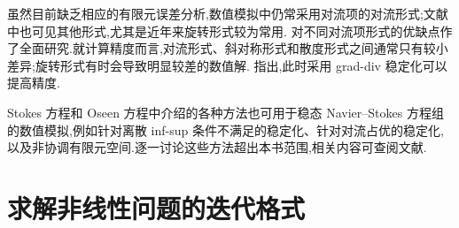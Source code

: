 \begin{note}[数值模拟中的对流项形式]\label{note:steady-ns-convection-forms-simulations}
虽然目前缺乏相应的有限元误差分析,数值模拟中仍常采用对流项的对流形式;文献中也可见其他形式,尤其是近年来旋转形式较为常用.\textcite{Rockel2013} 对不同对流项形式的优缺点作了全面研究.就计算精度而言,对流形式、斜对称形式和散度形式之间通常只有较小差异;旋转形式有时会导致明显较差的数值解.\textcite{Olshanskii2002} 指出,此时采用 grad-div 稳定化可以提高精度.
\end{note}

\begin{note}[其他离散方法]\label{note:steady-ns-other-discretizations}
Stokes 方程和 Oseen 方程中介绍的各种方法也可用于稳态 Navier--Stokes 方程组的数值模拟,例如针对离散 inf-sup 条件不满足的稳定化、针对对流占优的稳定化,以及非协调有限元空间.逐一讨论这些方法超出本书范围,相关内容可查阅文献.
\end{note}

\section{求解非线性问题的迭代格式}\label{sec:steady-ns-iterations}\label{sec:steady-ns-picard}

